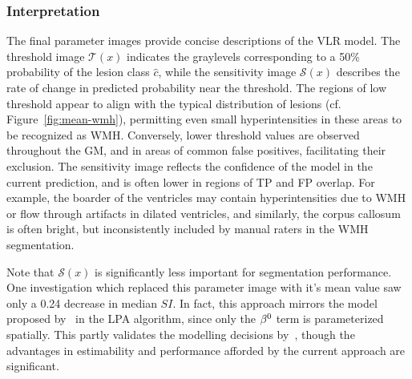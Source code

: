 \subsubsection{Interpretation}\label{sss:exp-beta-interp}
The final parameter images provide concise descriptions of the VLR model.
The threshold image $\mathcal{T}(x)$ indicates the graylevels
corresponding to a 50\% probability of the lesion class $\hat{c}$,
while the sensitivity image $\mathcal{S}(x)$ describes
the rate of change in predicted probability near the threshold.
The regions of low threshold appear to align with
the typical distribution of lesions (cf. Figure~\ref{fig:mean-wmh}),
permitting even small hyperintensities in these areas to be recognized as WMH.
Conversely, lower threshold values are observed throughout the GM,
and in areas of common false positives, facilitating their exclusion.
The sensitivity image reflects the confidence of the model in the current prediction,
and is often lower in regions of TP and FP overlap.
For example, the boarder of the ventricles may contain hyperintensities
due to WMH or flow through artifacts in dilated ventricles,
and similarly, the corpus callosum is often bright,
but inconsistently included by manual raters in the WMH segmentation.
\par
Note that $\mathcal{S}(x)$ is significantly less important for segmentation performance.
One investigation which replaced this parameter image with it's mean value 
saw only a 0.24 decrease in median $SI$.
In fact, this approach mirrors the model proposed by~\citeauthor{Schmidt2017} in the LPA algorithm,
since only the $\beta^0$ term is parameterized spatially.
This partly validates the modelling decisions by~\citeauthor{Schmidt2017},
though the advantages in estimability and performance
afforded by the current approach are significant.

